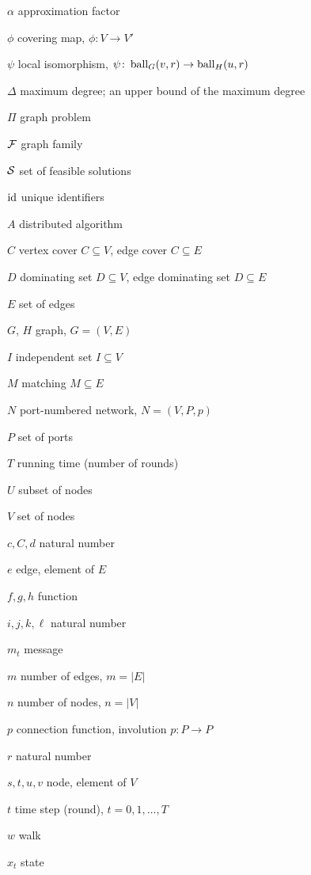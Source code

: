 {\raggedright
\begin{notation}
    \item[$\alpha$] approximation factor
    \item[$\phi$] covering map, $\phi \colon V \to V'$
    \item[$\psi$] local isomorphism, $\psi \colon \operatorname{ball}_G(v,r) \to \operatorname{ball}_H(u,r)$
    \item[$\Delta$] maximum degree; an upper bound of the maximum degree
    \item[$\Pi$] graph problem
    \item[$\mathcal{F}$] graph family
    \item[$\mathcal{S}$] set of feasible solutions
    \item[$\operatorname{id}$] unique identifiers
    \item[$A$] distributed algorithm
    \item[$C$] vertex cover $C \subseteq V$, edge cover $C \subseteq E$
    \item[$D$] dominating set $D \subseteq V$, edge dominating set $D \subseteq E$
    \item[$E$] set of edges
    \item[$G$, $H$] graph, $G = (V,E)$
    \item[$I$] independent set $I \subseteq V$
    \item[$M$] matching $M \subseteq E$
    \item[$N$] port-numbered network, $N = (V,P,p)$
    \item[$P$] set of ports
    \item[$T$] running time (number of rounds)
    \item[$U$] subset of nodes
    \item[$V$] set of nodes
    \item[$c,C,d$] natural number
    \item[$e$] edge, element of $E$
    \item[$f,g,h$] function
    \item[$i,j,k,\ell$] natural number
    \item[$m_t$] message
    \item[$m$] number of edges, $m = |E|$
    \item[$n$] number of nodes, $n = |V|$
    \item[$p$] connection function, involution $p \colon P \to P$
    \item[$r$] natural number
    \item[$s,t,u,v$] node, element of $V$
    \item[$t$] time step (round), $t = 0, 1, \dotsc, T$
    \item[$w$] walk
    \item[$x_t$] state
\end{notation}}

